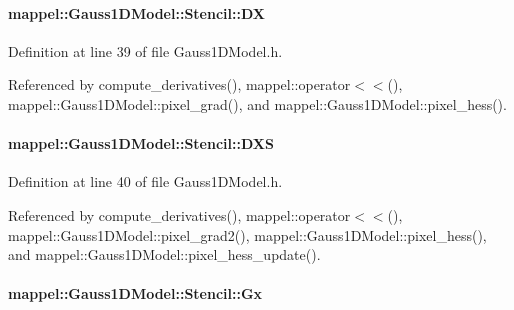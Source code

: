 \paragraph[{\texorpdfstring{DX}{DX}}]{ mappel\+::\+Gauss1\+D\+Model\+::\+Stencil\+::\+DX}\hypertarget{classmappel_1_1Gauss1DModel_1_1Stencil_a93a43ebc274ff8662990d8e71415f806}{}\label{classmappel_1_1Gauss1DModel_1_1Stencil_a93a43ebc274ff8662990d8e71415f806}


Definition at line 39 of file Gauss1\+D\+Model.\+h.



Referenced by compute\+\_\+derivatives(), mappel\+::operator$<$$<$(), mappel\+::\+Gauss1\+D\+Model\+::pixel\+\_\+grad(), and mappel\+::\+Gauss1\+D\+Model\+::pixel\+\_\+hess().

\paragraph[{\texorpdfstring{D\+XS}{DXS}}]{ mappel\+::\+Gauss1\+D\+Model\+::\+Stencil\+::\+D\+XS}\hypertarget{classmappel_1_1Gauss1DModel_1_1Stencil_aa8eaf4d165d0b19f9e4c44a60b066e54}{}\label{classmappel_1_1Gauss1DModel_1_1Stencil_aa8eaf4d165d0b19f9e4c44a60b066e54}


Definition at line 40 of file Gauss1\+D\+Model.\+h.



Referenced by compute\+\_\+derivatives(), mappel\+::operator$<$$<$(), mappel\+::\+Gauss1\+D\+Model\+::pixel\+\_\+grad2(), mappel\+::\+Gauss1\+D\+Model\+::pixel\+\_\+hess(), and mappel\+::\+Gauss1\+D\+Model\+::pixel\+\_\+hess\+\_\+update().

\paragraph[{\texorpdfstring{Gx}{Gx}}]{ mappel\+::\+Gauss1\+D\+Model\+::\+Stencil\+::\+Gx}\hypertarget{classmappel_1_1Gauss1DModel_1_1Stencil_af526cf4c9b59b898727d741f692970e8}{}\label{classmappel_1_1Gauss1DModel_1_1Stencil_af526cf4c9b59b898727d741f692970e8}


